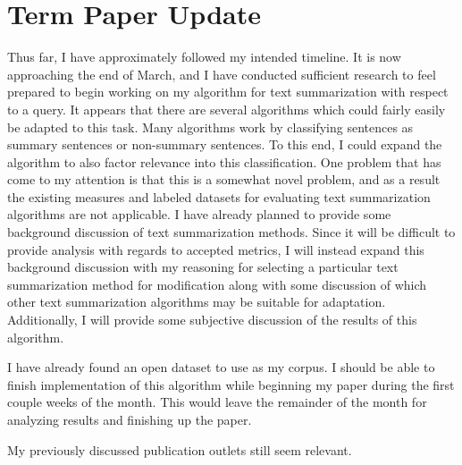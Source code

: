 \documentclass[11pt]{article}
\author{ethan}
\date{\today}
\title{}
\begin{document}
\tableofcontents

\section{Term Paper Update}
\label{sec:org52ba2ca}
Thus far, I have approximately followed my intended timeline. It is now approaching the end of March, and I have conducted sufficient research to feel prepared to begin working on my algorithm for text summarization with respect to a query. It appears that there are several algorithms which could fairly easily be adapted to this task. Many algorithms work by classifying sentences as summary sentences or non-summary sentences. To this end, I could expand the algorithm to also factor relevance into this classification. One problem that has come to my attention is that this is a somewhat novel problem, and as a result the existing measures and labeled datasets for evaluating text summarization algorithms are not applicable. I have already planned to provide some background discussion of text summarization methods. Since it will be difficult to provide analysis with regards to accepted metrics, I will instead expand this background discussion with my reasoning for selecting a particular text summarization method for modification along with some discussion of which other text summarization algorithms may be suitable for adaptation. Additionally, I will provide some subjective discussion of the results of this algorithm.

I have already found an open dataset to use as my corpus. I should be able to finish implementation of this algorithm while beginning my paper during the first couple weeks of the month. This would leave the remainder of the month for analyzing results and finishing up the paper.

My previously discussed publication outlets still seem relevant.
\end{document}
